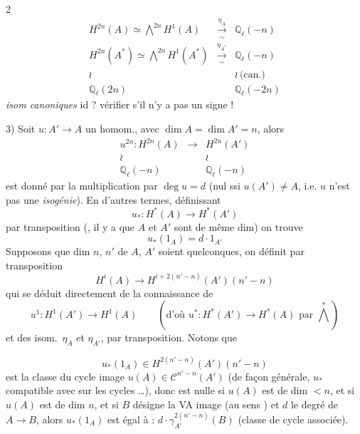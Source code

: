\documentclass[11pt,a4paper]{article}
\begin{document}
2
\[
  \begin{array}{rcl}
  H^{2n}(A) \simeq {\textstyle\bigwedge^{2n}} H^{1}(A) & \xrightarrow[\ \sim\ ]{\eta_{A}} & \mathbb{Q}_{\ell}(-n) \\[2pt]
  H^{2n}(A^{*}) \simeq {\textstyle\bigwedge^{2n}} H^{1}(A^{*}) & \xrightarrow[\ \sim\ ]{\eta_{A^{*}}} & \mathbb{Q}_{\ell}(-n) \\[2pt]
  \wr & & \wr\ \text{(can.)} \\
  \mathbb{Q}_{\ell}(2n) & & \mathbb{Q}_{\ell}(-2n)
  \end{array}
\]
\emph{isom canoniques} \quad id ? \quad vérifier s'il n'y a pas un signe !


3) Soit $u : A' \to A$ un  homom., avec $\dim A = \dim A' = n$, alors
\[
  \begin{array}{ccc}
  u^{2n} : H^{2n}(A) & \longrightarrow & H^{2n}(A') \\
  \wr & & \wr \\
  \mathbb{Q}_{\ell}(-n) & & \mathbb{Q}_{\ell}(-n)
  \end{array}
\]
est donné par la multiplication par $\deg u = d$ (nul ssi $u(A') \neq A$, i.e. $u$ n'est pas une
\emph{isogénie}). En d'autres termes, définissant \struck{\ill{}}
\[
  u_{*} : H^{*}(A) \longrightarrow H^{*}(A')
\]
par transposition (, il y a que $A$ et $A'$ sont de même dim) on trouve
\[
  u_{*}(1_{A}) = d \cdot 1_{A'}
\]
Supposons que   dim $n$, $n'$ de $A$, $A'$ soient quelconques, on
définit par transposition
\[
  H^{i}(A) \longrightarrow H^{i+2(n'-n)}(A')(n'-n)
\]
 qui se déduit directement de la connaissance de
\[
  u^{1} : H^{1}(A') \longrightarrow H^{1}(A) \qquad
  (\text{d'où } u^{*} : H^{*}(A') \to H^{*}(A) \text{ par } {\textstyle\bigwedge^{*}})
\]
et des isom.\ $\eta_{A}$ et $\eta_{A'}$, par transposition. Notons que

\struck{\ill{}}
\[
  u_{*}(1_{A}) \in H^{2(n'-n)}(A')(n'-n)
\]
est la classe du cycle image $u(A) \in \mathcal{C}^{n'-n}(A')$ (de façon générale, $u_{*}$
compatible avec    sur les cycles …), donc
est nulle si $u(A)$ est de dim $< n$, et si $u(A)$ est de dim $n$, et si $B$ désigne la VA
\struck{\ill{}} image (au sens ) et $d$ le degré de
 $A \to B$, alors $u_{*}(1_{A})$ est égal à :
$d \cdot \gamma^{2(n'-n)}_{A'}(B)$ (classe de cycle associée).
\end{document}

